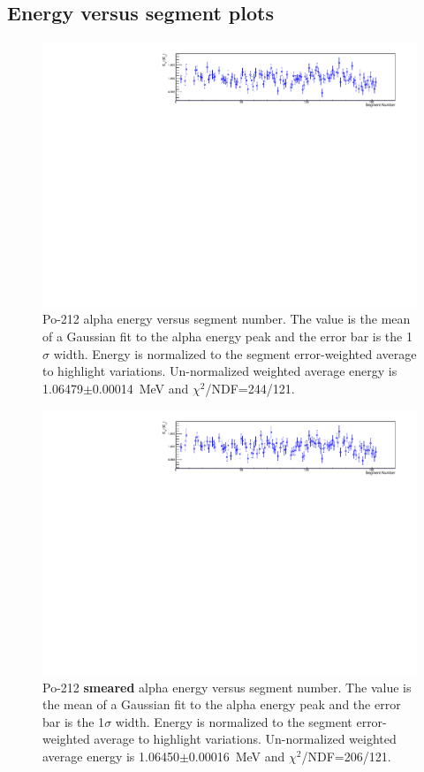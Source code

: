 \subsection{Energy versus segment plots}
\begin{figure}[!h]
\centering
\includegraphics[width=1.05\textwidth]{figures/PubBiPo212EvsCell.pdf}
\caption{\label{fig:EvsCell212}Po-212 alpha energy versus segment number. The value is the mean of a Gaussian fit to the alpha energy peak and the error bar is the 1$\sigma$ width. Energy is normalized to the segment error-weighted average to highlight variations. Un-normalized weighted average energy is 1.06479$\pm$0.00014~MeV and $\chi^2$/NDF=244/121.}
\end{figure}
\begin{figure}[!h]
\centering
\includegraphics[width=1.05\textwidth]{figures/PubBiPo212EsmearvsCell.pdf}
\caption{\label{fig:EsmearvsCell212}Po-212 {\bf smeared} alpha energy versus segment number. The value is the mean of a Gaussian fit to the alpha energy peak and the error bar is the 1$\sigma$ width. Energy is normalized to the segment error-weighted average to highlight variations. Un-normalized weighted average energy is 1.06450$\pm$0.00016~MeV and $\chi^2$/NDF=206/121.}
\end{figure}
